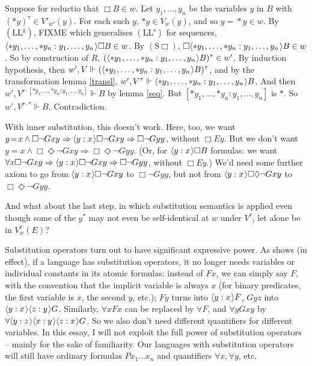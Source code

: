 \documentclass[11pt]{woarticle}
\newcommand{\cmnt}[1]{\iffalse #1 \fi}
\theoremstyle{break}
\theoremstyle{nonumberplain}
\newcommand{\SAT}{\Vdash}
\newcommand{\1}{\;\,|\;\,}
\renewcommand{\t}[1]{\ensuremath{\langle #1  \makebox[.2ex]{}\rangle}}
\newcommand{\T}[1]{\ensuremath{(\mathrm{ #1})}}
\begin{document}
{  Suppose for reductio that $\Box B \in w$. Let $y_1,\ldots,y_n$ be
  the variables $y$ in $B$ with $(*y)^\tau \in V'_{w'}(y)$. For each
  such $y$, $*y \in V_w(y)$, and so $y\!=\!*y \in w$. By \T{LL^g}, FIXME
  which generalises \T{LL^s} for sequences, $\t{*y_1,\ldots,*y_n :
    y_1,\ldots, y_n}\Box B \in w$. By \T{S\Box},
  $\Box\t{*y_1,\ldots,*y_n : y_1,\ldots, y_n} B \in w$. So by
  construction of $R$, $(\t{*y_1,\ldots,*y_n : y_1,\ldots, y_n}
  B)^\tau \in w'$. By induction hypothesis, then $w', V \SAT
  (\t{*y_1,\ldots,*y_n : y_1,\ldots, y_n} B)^\tau$, and by the
  transformation lemma \ref{transl}, $w', V^\tau \SAT
  \t{*y_1,\ldots,*y_n : y_1,\ldots, y_n} B$. And then $w', V^{\tau
    \cdot [*y_1,\ldots,*y_n / y_1,\ldots, y_n]} \SAT B$ by lemma
  \ref{seq}. But $[*y_1,\ldots,*y_n : y_1,\ldots, y_n]$ is
  $*$. \cmnt{(If $(*y)^\tau \not\in V'_{w'}(y)$, then $V'_{w'}(y)$ is
    undefined, and there is no $z \in V_w(y)$ with $z^\tau \in
    V'_{w'}(y)$, so then $*y = y$.)} So $w',V^{\tau\cdot *} \SAT
  B$. Contradiction.

  With inner substitution, this doesn't work. Here, too, we want
  $y\!=\!x \land \Box \neg Gxy \Rightarrow \t{y:x} \Box \neg Gxy
  \Rightarrow \Box \neg Gyy$, without $\Box Ey$. But we don't want
  $y\!=\!x \land \Box \Diamond \neg Gxy \Rightarrow \Box \Diamond \neg
  Gyy$.  (Or, for $\t{y:x}\Box B$ formulas: we want $\forall x \Box
  \neg Gxy \Rightarrow \t{y:x}\Box \neg Gxy \Rightarrow \Box \neg
  Gyy$, without $\Box Ey$.) We'd need some further axiom to go from
  $\t{y:x}\Box \neg Gxy$ to $\Box \neg Gyy$, but not from $\t{y:x}\Box
  \Diamond \neg Gxy$ to $\Box \Diamond \neg Gyy$.

  And what about the last step, in which substitution semantics is
  applied even though some of the $y^*$ may not even be self-identical
  at $w$ under $V^\tau$, let alone be in $V^\tau_w(E)$?
  
}

Substitution operators turn out to have significant expressive power. As
\cite{kuhn80quantifiers}\label{kuhn} shows (in effect), if a language has
substitution operators, it no longer needs variables or individual constants in
its atomic formulas: instead of $Fx$, we can simply say $F$, with the convention
that the implicit variable is always $x$ (for binary predicates, the first
variable is $x$, the second $y$, etc.); $Fy$ turns into $\t{y:x}F$, $Gyz$ into
$\t{y:x}\t{z:y}G$. Similarly, $\forall x Fx$ can be replaced by $\forall F$, and
$\forall y Gxy$ by $\forall \t{y:z}\t{x:y}\t{z:x} G$.%
\cmnt{%
  $\t{y:z}\t{x:y}\t{z:x}$ is the swapping operator $\t{x,y:y,x}$.
  $\forall y Gxy$ is equivalent to $\t{x,y:y,x} \forall x Gyx$. Directly,
  $\forall y Gxy$ is true at a sequence $abc\ldots$ iff $Gxy$ is true at
  $ab'c\ldots$ for all $b'$. Moreover, $Gxy$ is true at $ab'c$ iff
  $\t{x,y:y,x}Gxy$ is true at $b'ac\ldots$.%
} %
So we also don't need different quantifiers for different variables. In this
essay, I will not exploit the full power of substitution operators -- mainly for
the sake of familiarity. Our languages with substitution operators will still
have ordinary formulas $Px_1\ldots x_n$ and quantifiers $\forall x, \forall y$,
etc.
\end{document}
